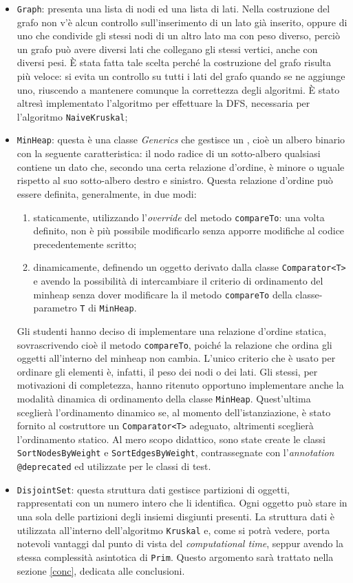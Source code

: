 \begin{itemize}
	\item \texttt{Graph}: presenta una lista di nodi ed una lista di lati. Nella costruzione del grafo non v'è alcun controllo sull'inserimento di un lato già inserito, oppure di uno che condivide gli stessi nodi di un altro lato ma con peso diverso, perciò un grafo può avere diversi lati che collegano gli stessi vertici, anche con diversi pesi. È stata fatta tale scelta perché la costruzione del grafo risulta più veloce:  si evita un controllo su tutti i lati del grafo quando se ne aggiunge uno, riuscendo a mantenere comunque la correttezza degli algoritmi. È stato altresì implementato l'algoritmo per effettuare la DFS, necessaria per l'algoritmo \texttt{NaiveKruskal};	
	\item \texttt{MinHeap}: questa è una classe \emph{Generics} che gestisce un , cioè un albero binario con la seguente caratteristica: il nodo radice di un sotto-albero qualsiasi contiene un dato che, secondo una certa relazione d'ordine, è minore o uguale rispetto al suo sotto-albero destro e sinistro. Questa relazione d'ordine può essere definita, generalmente, in due modi:
	\begin{enumerate}
		\item staticamente, utilizzando l'\emph{override} del metodo \texttt{compareTo}: una volta definito, non è più possibile modificarlo senza apporre modifiche al codice precedentemente scritto;
		\item dinamicamente, definendo un oggetto derivato dalla classe \texttt{Comparator<T>} e avendo la possibilità di intercambiare il criterio di ordinamento del minheap senza dover modificare la il metodo \texttt{compareTo} della classe-parametro \texttt{T} di \texttt{MinHeap}.
	\end{enumerate}
	Gli studenti hanno deciso di implementare una relazione d'ordine statica, sovrascrivendo cioè il metodo \texttt{compareTo}, poiché la relazione che ordina gli oggetti all'interno del minheap non cambia. L'unico criterio che è usato per ordinare gli elementi è, infatti, il peso dei nodi o dei lati. Gli stessi, per motivazioni di completezza, hanno ritenuto opportuno implementare anche la modalità dinamica di ordinamento della classe \texttt{MinHeap}. Quest'ultima sceglierà l'ordinamento dinamico se, al momento dell'istanziazione, è stato fornito al costruttore un \texttt{Comparator<T>} adeguato, altrimenti sceglierà l'ordinamento statico. \eqcapo
	Al mero scopo didattico, sono state create le classi \texttt{SortNodesByWeight} e \texttt{SortEdgesByWeight}, contrassegnate con l'\emph{annotation} \texttt{@deprecated} ed utilizzate per le classi di test.\eqcapo
	\item \texttt{DisjointSet}: questa struttura dati gestisce partizioni di oggetti, rappresentati con un numero intero che li identifica. Ogni oggetto può stare in una sola delle partizioni degli insiemi disgiunti presenti. La struttura dati è utilizzata all'interno dell'algoritmo \texttt{Kruskal} e, come si potrà vedere, porta notevoli vantaggi dal punto di vista del \emph{computational time}, seppur avendo la stessa complessità asintotica di \texttt{Prim}. Questo argomento sarà trattato nella sezione \ref{conc}, dedicata alle conclusioni.
\end{itemize} 

